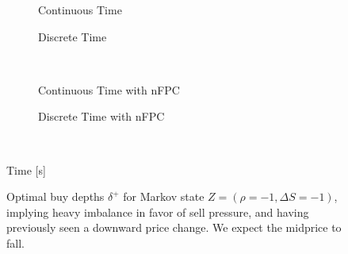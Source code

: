 \begin{figure}%
\centering%
\begin{subfigure}[b]{.4\linewidth}%
  \setlength\figureheight{\linewidth}%
  \setlength\figurewidth{\linewidth}%
  \caption{Continuous Time}%
\end{subfigure}%
\hspace{1.5cm}%
\begin{subfigure}[b]{.4\linewidth}%
  \setlength\figureheight{\linewidth}%
  \setlength\figurewidth{\linewidth}%
  \caption{Discrete Time}%
\end{subfigure}\\%
\vspace{1cm}%
\begin{subfigure}[b]{.4\linewidth}%
  \setlength\figureheight{\linewidth}%
  \setlength\figurewidth{\linewidth}%
  \caption{Continuous Time with nFPC}%
\end{subfigure}%
\hspace{1.5cm}%
\begin{subfigure}[b]{.4\linewidth}%
  \setlength\figureheight{\linewidth}%
  \setlength\figurewidth{\linewidth}%
  \caption{Discrete Time with nFPC}%
\end{subfigure}\\%
%
\leavevmode{}\hspace{0pt plus 1filll}\null%

Time [s]

\vspace{1cm}%
\begin{subfigure}{\linewidth}%
  \centering%
\end{subfigure}%
  \caption[Optimal buy LO depths for sell pressure imbalance]{Optimal buy depths $\delta^{+}$ for Markov state $Z=(\rho = -1, \Delta S = -1)$, implying heavy imbalance in favor of sell pressure, and having previously seen a downward price change. We expect the midprice to fall.}\label{fig:comp_dp_z1}%
\end{figure}
